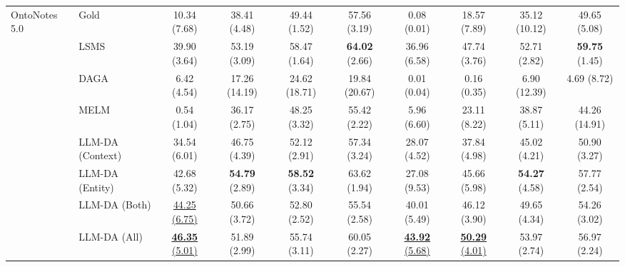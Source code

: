 \documentclass[11pt]{article}
\begin{document}
\begin{table}[!t]
{\begin{tabular}{l|l|cccc|cccc}
        \multirow{9}{*}{{OntoNotes 5.0}} & Gold & 10.34 (7.68) & 38.41 (4.48) & 49.44 (1.52) & 57.56 (3.19) & 0.08 (0.01) & 18.57 (7.89) & 35.12 (10.12) & 49.65 (5.08) \\ 
        ~ & LSMS & 39.90 (3.64) & 53.19 (3.09) & 58.47 (1.64) & \textbf{64.02} (2.66) & 36.96 (6.58) & 47.74 (3.76) & 52.71 (2.82) & \textbf{59.75} (1.45) \\ 
        ~ & DAGA & 6.42 (4.54) & 17.26 (14.19) & 24.62 (18.71) & 19.84 (20.67) & 0.01 (0.04) & 0.16 (0.35) & 6.90 (12.39) & 4.69 (8.72) \\
        ~ & MELM & 0.54 (1.04) & 36.17 (2.75) & 48.25 (3.32) & 55.42 (2.22) & 5.96 (6.60) & 23.11 (8.22) & 38.87 (5.11) & 44.26 (14.91) \\ 
        \rowcolor{gray!10} \cellcolor{gray!0}OntoNotes 5.0 & LLM-DA (Context) & {34.54 (6.01)} & {46.75 (4.39)} & {52.12 (2.91)} & 57.34 (3.24) & {28.07 (4.52)} & {37.84 (4.98)} & {45.02 (4.21)} & 50.90 (3.27) \\ 
        \rowcolor{gray!10} \cellcolor{gray!0}~ & LLM-DA (Entity) & 42.68 (5.32) & \textbf{54.79} (2.89) & \textbf{58.52} (3.34) & 63.62 (1.94) & {27.08 (9.53)} & 45.66 (5.98) & \textbf{54.27} (4.58) & {57.77 (2.54)} \\ 
        \rowcolor{gray!10} \cellcolor{gray!0}~ & LLM-DA (Both) & \underline{44.25 (6.75)} & {50.66 (3.72)} & {52.80 (2.52)} & 55.54 (2.58) & 40.01 (5.49) & 46.12 (3.90) & {49.65 (4.34)} & {54.26 (3.02)} \\ 
        \rowcolor{gray!10} \cellcolor{gray!0}~ & LLM-DA (All) & \underline{\textbf{46.35} (5.01)} & 51.89 (2.99) & {55.74 (3.11)} & {60.05 (2.27)} & \underline{\textbf{43.92} (5.68)} & \underline{\textbf{50.29} (4.01)} & 53.97 (2.74) & {56.97 (2.24)} \\
        \midrule
        

\end{tabular}}
\end{table}
\end{document}
